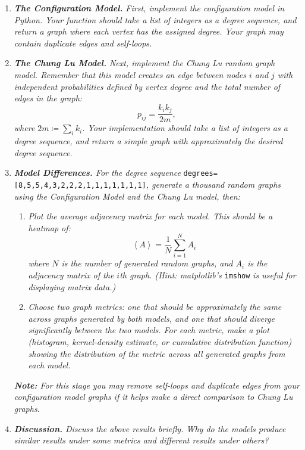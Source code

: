 \documentclass{article}
\newcommand{\Ang}[1]{\left\langle #1 \right\rangle}
\begin{document}
\begin{enumerate}
    \item \textit{\textbf{The Configuration Model.} First, implement the configuration model in Python. Your function should take a list of integers as a degree sequence, and return a graph where each vertex has the assigned degree. Your graph may contain duplicate edges and self-loops.}
    \item \textit{\textbf{The Chung Lu Model.} Next, implement the Chung Lu random graph model. Remember that this model creates an edge between nodes $i$ and $j$ with independent probabilities defined by vertex degree and the total number of edges in the graph:}
    \[
        p_{ij} = \frac{k_i k_j}{2m},
    \]
    \textit{where $2m \coloneqq \sum_i k_i$. Your implementation should take a list of integers as a degree sequence, and return a simple graph with approximately the desired degree sequence.}
    \item \textit{\textbf{Model Differences.} For the degree sequence }\texttt{degrees=[8,5,5,4,3,2,2,2,1,1,1,1,1,1,1]}\textit{, generate a thousand random graphs using the Configuration Model and the Chung Lu model, then:}
    \begin{enumerate}
        \item \textit{Plot the average adjacency matrix for each model. This should be a heatmap of:}
        \[
            \Ang{A} = \frac{1}{N}\sum_{i=1}^{N} A_i
        \]
        \textit{where $N$ is the number of generated random graphs, and $A_i$ is the adjacency matrix of the $i$th graph. (Hint: matplotlib's }\texttt{imshow}\textit{ is useful for displaying matrix data.)}
        \item \textit{Choose two graph metrics: one that should be approximately the same across graphs generated by both models, and one that should diverge significantly between the two models. For each metric, make a plot (histogram, kernel-density estimate, or cumulative distribution function) showing the distribution of the metric across all generated graphs from each model.}
    \end{enumerate}
    \textit{\textbf{Note:} For this stage you may remove self-loops and duplicate edges from your configuration model graphs if it helps make a direct comparison to Chung Lu graphs.}
    \item \textit{\textbf{Discussion.} Discuss the above results briefly. Why do the models produce similar results under some metrics and different results under others?}
\end{enumerate}
\end{document}
